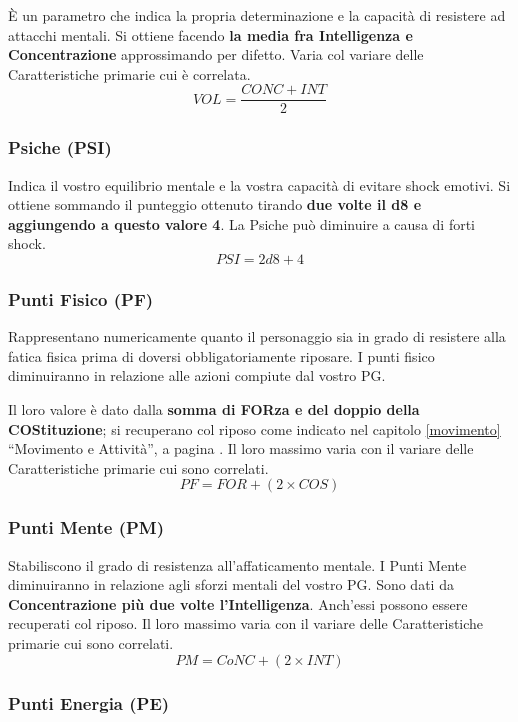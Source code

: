 \`E un parametro che indica la propria determinazione e la capacit\`a
di resistere ad attacchi mentali. Si ottiene facendo \textbf{la media
  fra Intelligenza e Concentrazione} approssimando per difetto.  Varia
col variare delle Caratteristiche primarie cui \`e correlata.
$$VOL=\frac{CONC + INT}{2}$$

\subsubsection{Psiche (PSI)}

Indica il vostro equilibrio mentale e la vostra capacit\`a di evitare
shock emotivi.  Si ottiene sommando il punteggio ottenuto tirando
\textbf{due volte il d8 e aggiungendo a questo valore 4}. La Psiche
pu\`o diminuire a causa di forti shock.
$$PSI=2d8 + 4$$

\subsubsection{Punti Fisico (PF)}

Rappresentano numericamente quanto il personaggio sia in grado di
resistere alla fatica fisica prima di doversi obbligatoriamente
riposare. I punti fisico diminuiranno in relazione alle azioni
compiute dal vostro PG.  

Il loro valore \`e dato dalla \textbf{somma di FORza e del
  doppio della COStituzione}; si recuperano col riposo come indicato
nel capitolo \ref{movimento} ``Movimento e Attivit\`a'', a pagina
\pageref{movimento}.  Il loro massimo varia con il variare delle
Caratteristiche primarie cui sono correlati.
$$PF=FOR + (2 \times COS)$$

\subsubsection{Punti Mente (PM)}

Stabiliscono il grado di resistenza all'affaticamento mentale. I Punti
Mente diminuiranno in relazione agli sforzi mentali del vostro PG.
Sono dati da \textbf{Concentrazione pi\`u due volte l'Intelligenza}.
Anch'essi possono essere recuperati col riposo. Il loro massimo varia
con il variare delle Caratteristiche primarie cui sono correlati.
$$PM=CoNC + (2 \times INT)$$

\subsubsection{Punti Energia (PE)}

